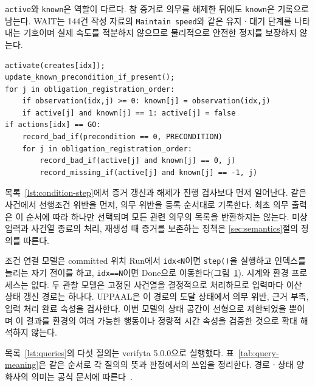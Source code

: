 \begin{revision}
\texttt{active}와 \texttt{known}은 역할이 다르다. 참 증거로 의무를 해제한 뒤에도 \texttt{known}은 기록으로 남는다. WAIT는 144건 작성 자료의 \texttt{Maintain speed}와 같은 유지ㆍ대기 단계를 나타내는 기호이며 실제 속도를 적분하지 않으므로 물리적으로 안전한 정지를 보장하지 않는다.

\begin{lstlisting}[caption={조건 연결 모델의 step 함수 요약(실제 XML 기준).},label={lst:condition-step}]
activate(creates[idx]);
update_known_precondition_if_present();
for j in obligation_registration_order:
    if observation(idx,j) >= 0: known[j] = observation(idx,j)
    if active[j] and known[j] == 1: active[j] = false
if actions[idx] == GO:
    record_bad_if(precondition == 0, PRECONDITION)
    for j in obligation_registration_order:
        record_bad_if(active[j] and known[j] == 0, j)
        record_missing_if(active[j] and known[j] == -1, j)
\end{lstlisting}

목록~\ref{lst:condition-step}에서 증거 갱신과 해제가 진행 검사보다 먼저 일어난다. 같은 사건에서 선행조건 위반을 먼저, 의무 위반을 등록 순서대로 기록한다. 최초 의무 출력은 이 순서에 따라 하나만 선택되며 모든 관련 의무의 목록을 반환하지는 않는다. 미상 입력과 사건열 종료의 처리, 재생성 때 증거를 보존하는 정책은 \ref{sec:semantics}절의 정의를 따른다.

조건 연결 모델은 committed 위치 Run에서 \texttt{idx<N}이면 \texttt{step()}을 실행하고 인덱스를 늘리는 자기 전이를 하고, \texttt{idx==N}이면 Done으로 이동한다(그림~\ref{fig:condition-observer}). 시계와 환경 프로세스는 없다. 두 관찰 모델은 고정된 사건열을 결정적으로 처리하므로 입력마다 이산 상태 갱신 경로는 하나다. UPPAAL은 이 경로의 도달 상태에서 의무 위반, 근거 부족, 입력 처리 완료 속성을 검사한다. 이번 모델의 상태 공간이 선형으로 제한되었을 뿐이며 이 결과를 환경의 여러 가능한 행동이나 정량적 시간 속성을 검증한 것으로 확대 해석하지 않는다.

\begin{figure}[t]
\centering
\color{revisionblue}

\label{fig:condition-observer}
\end{figure}

목록~\ref{lst:queries}의 다섯 질의는 verifyta 5.0.0으로 실행했다. 표~\ref{tab:query-meaning}은 같은 순서로 각 질의의 뜻과 판정에서의 쓰임을 정리한다. 경로ㆍ상태 양화사의 의미는 공식 문서에 따른다~\cite{uppaalqueries}.


\end{revision}
